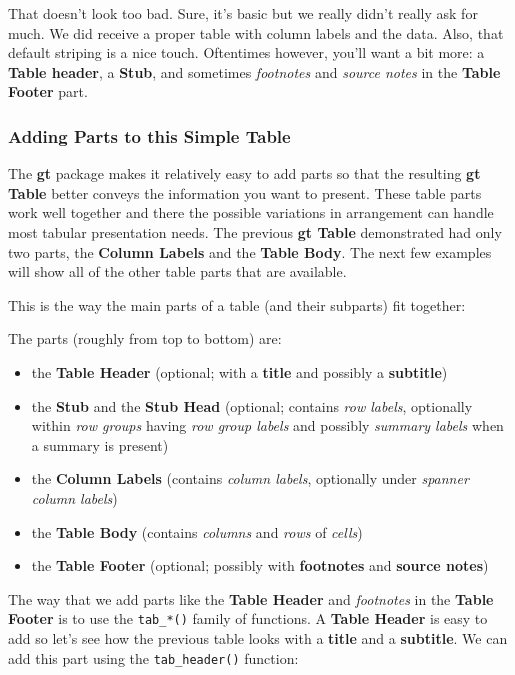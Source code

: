 \documentclass[]{article}
\providecommand{\tightlist}{%
  \setlength{\itemsep}{0pt}\setlength{\parskip}{0pt}}
\begin{document}
That doesn't look too bad. Sure, it's basic but we really didn't really
ask for much. We did receive a proper table with column labels and the
data. Also, that default striping is a nice touch. Oftentimes however,
you'll want a bit more: a \textbf{Table header}, a \textbf{Stub}, and
sometimes \emph{footnotes} and \emph{source notes} in the \textbf{Table
Footer} part.

\subsubsection{Adding Parts to this Simple
Table}\label{adding-parts-to-this-simple-table}

The \textbf{gt} package makes it relatively easy to add parts so that
the resulting \textbf{gt Table} better conveys the information you want
to present. These table parts work well together and there the possible
variations in arrangement can handle most tabular presentation needs.
The previous \textbf{gt Table} demonstrated had only two parts, the
\textbf{Column Labels} and the \textbf{Table Body}. The next few
examples will show all of the other table parts that are available.

This is the way the main parts of a table (and their subparts) fit
together:

The parts (roughly from top to bottom) are:

\begin{itemize}
\tightlist
\item
  the \textbf{Table Header} (optional; with a \textbf{title} and
  possibly a \textbf{subtitle})
\item
  the \textbf{Stub} and the \textbf{Stub Head} (optional; contains
  \emph{row labels}, optionally within \emph{row groups} having
  \emph{row group labels} and possibly \emph{summary labels} when a
  summary is present)
\item
  the \textbf{Column Labels} (contains \emph{column labels}, optionally
  under \emph{spanner column labels})
\item
  the \textbf{Table Body} (contains \emph{columns} and \emph{rows} of
  \emph{cells})
\item
  the \textbf{Table Footer} (optional; possibly with \textbf{footnotes}
  and \textbf{source notes})
\end{itemize}

The way that we add parts like the \textbf{Table Header} and
\emph{footnotes} in the \textbf{Table Footer} is to use the
\texttt{tab\_*()} family of functions. A \textbf{Table Header} is easy
to add so let's see how the previous table looks with a \textbf{title}
and a \textbf{subtitle}. We can add this part using the
\texttt{tab\_header()} function:
\end{document}
